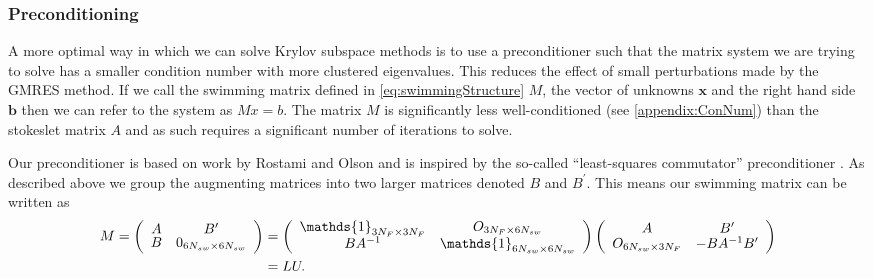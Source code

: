 \subsubsection{Preconditioning} \label{sec:Preconditioning}
A more optimal way in which we can solve Krylov subspace methods is to use a preconditioner such that the matrix system we are trying to solve has a smaller condition number with more clustered eigenvalues. This reduces the effect of small perturbations made by the GMRES method. If we call the swimming matrix defined in \cref{eq:swimmingStructure} $M$, the vector of unknowns $\bm{x}$ and the right hand side $\bm{b}$ then we can refer to the system as $Mx=b$. The matrix $M$ is significantly less well-conditioned (see \cref{appendix:ConNum}) than the stokeslet matrix $A$ and as such requires a significant number of iterations to solve.


Our preconditioner is based on work by Rostami and Olson \cite{Rostami2019FastBiofluids} and is inspired by the so-called “least-squares commutator” preconditioner \cite{Elman2005FiniteDynamics}. As described above we group the augmenting matrices into two larger matrices denoted $B$ and $B^\prime$. This means our swimming matrix can be written as 
\begin{equation*}
\begin{aligned}
\def\arraystretch{0.8}
    M = \left(\begin{array}{cc}
        A & B^\prime \\
        B & 0_{6N_{sw}\times6N_{sw}} 
    \end{array}\right) &= 
    \left(\begin{array}{cc}
        \mathds{1}_{3N_F \times 3N_F} & O_{3N_F\times6N_{sw}} \\
        BA^{-1} & \mathds{1}_{6N_{sw} \times 6N_{sw}}
    \end{array}\right)
    \left(\begin{array}{cc}
        A & B^\prime \\
        O_{6N_{sw}\times3N_F} & -BA^{-1}B^\prime
    \end{array}\right) \\
    &= LU.
\end{aligned}
\end{equation*}

